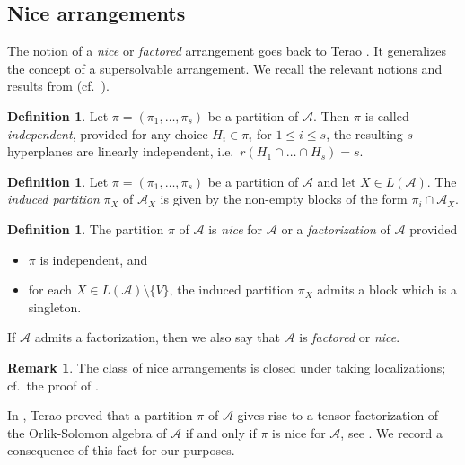 \documentclass[12pt]{amsart}
\newcommand\CA{{\mathscr A}}
\numberwithin{equation}{section}
\theoremstyle{plain}
\theoremstyle{definition}
\newtheorem{defn}[equation]{Definition}
\newtheorem{remark}[equation]{Remark}
\begin{document}
\subsection{Nice arrangements}
\label{ssect:factored}

The notion of a \emph{nice} or \emph{factored}
arrangement goes back to Terao \cite{terao:factored}.
It generalizes the concept of a supersolvable arrangement.
We recall the relevant notions and results from \cite{terao:factored}
(cf.\  \cite[\S 2.3]{orlikterao:arrangements}).

\begin{defn}
	\label{def:independent}
	Let $\pi = (\pi_1, \ldots , \pi_s)$ be a partition of $\CA$.
	Then $\pi$ is called \emph{independent}, provided
	for any choice $H_i \in \pi_i$ for $1 \le i \le s$,
	the resulting $s$ hyperplanes are linearly independent, i.e.\
	$r(H_1 \cap \ldots \cap H_s) = s$.
\end{defn}

\begin{defn}
	\label{def:indpart}
	Let $\pi = (\pi_1, \ldots , \pi_s)$ be a partition of $\CA$
	and let $X \in L(\CA)$.
	The \emph{induced partition} $\pi_X$ of $\CA_X$ is given by the non-empty
	blocks of the form $\pi_i \cap \CA_X$.
\end{defn}

\begin{defn}
	\label{def:factored}
	The partition
	$\pi$ of $\CA$ is
	\emph{nice} for $\CA$ or a \emph{factorization} of $\CA$  provided
	\begin{itemize}
		\item[(i)] $\pi$ is independent, and
		\item[(ii)] for each $X \in L(\CA) \setminus \{V\}$, the induced partition $\pi_X$ admits a block
		which is a singleton.
	\end{itemize}
	If $\CA$ admits a factorization, then we also say that $\CA$ is \emph{factored} or \emph{nice}.
\end{defn}

\begin{remark}
	\label{rem:factored}
	The class of nice arrangements is closed under taking localizations;
	cf.~the proof of \cite[Cor.~2.11]{terao:factored}.
\end{remark}

In \cite[Thm.\ 2.8]{terao:factored},
Terao proved that a partition $\pi$ of $\CA$ gives
rise to a tensor factorization of the Orlik-Solomon algebra of $\CA$
if and only if $\pi$ is
nice for
$\CA$, see \cite[Thm.~3.87]{orlikterao:arrangements}.
We record a consequence of this fact for our purposes.
\end{document}
